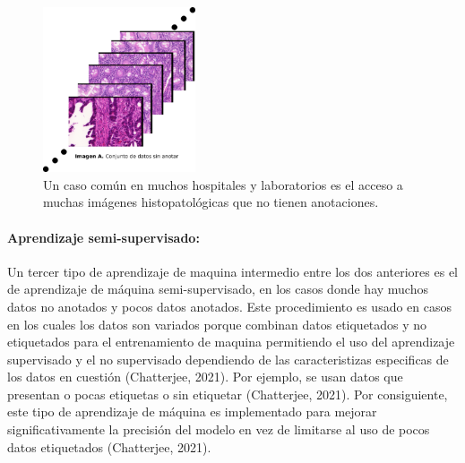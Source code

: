 \documentclass[12pt,letterpaper,final, openany]{scrbook}
\begin{document}
\begin{figure}[h!]
    \centering
    \includegraphics[width=0.4\textwidth]{unlabelled.png}
   \caption{Un caso común en muchos hospitales y laboratorios es el acceso a muchas imágenes histopatológicas que no tienen anotaciones.}
   \label{fig:unlabelled}
\end{figure}


\paragraph{Aprendizaje semi-supervisado:}

Un tercer tipo de aprendizaje de maquina intermedio entre los dos anteriores es el de aprendizaje de máquina semi-supervisado, en los casos donde hay muchos datos no anotados y pocos datos anotados. Este procedimiento es usado en casos en los cuales los datos son variados porque combinan datos etiquetados y no etiquetados para el entrenamiento de maquina permitiendo el uso del aprendizaje supervisado y el no supervisado dependiendo de las caracteristizas especificas de los datos en cuestión (Chatterjee, 2021). Por ejemplo, se usan datos que presentan o pocas etiquetas o sin etiquetar (Chatterjee, 2021). Por consiguiente, este tipo de aprendizaje de máquina es implementado para mejorar significativamente la precisión del modelo en vez de limitarse al uso de pocos datos etiquetados (Chatterjee, 2021).
\end{document}
